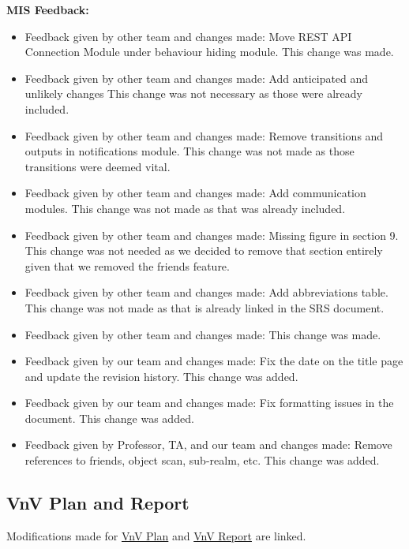 \documentclass{article}
\begin{document}
\textbf{MIS Feedback:}
\begin{itemize}
    \item Feedback given by other team and changes made: Move REST API Connection Module under behaviour hiding module. This change was made.
    \item Feedback given by other team and changes made: Add anticipated and unlikely changes This change was not necessary as those were already included.
    \item Feedback given by other team and changes made: Remove transitions and outputs in notifications module. This change was not made as those transitions were deemed vital.
    \item Feedback given by other team and changes made: Add communication modules. This change was not made as that was already included.
    \item Feedback given by other team and changes made: Missing figure in section 9. This change was not needed as we decided to remove that section entirely given that we removed the friends feature.
    \item Feedback given by other team and changes made: Add abbreviations table. This change was not made as that is already linked in the SRS document.
    \item Feedback given by other team and changes made:  This change was made.
    \item Feedback given by our team and changes made: Fix the date on the title page and update the revision history. This change was added.
    \item Feedback given by our team and changes made: Fix formatting issues in the document. This change was added.
    \item Feedback given by Professor, TA, and our team and changes made: Remove references to friends, object scan, sub-realm, etc. This change was added.
\end{itemize}

\subsection{VnV Plan and Report}

Modifications made for \href{https://github.com/russellrd/realm/pull/144}{VnV Plan} and \href{https://github.com/russellrd/realm/pull/151}{VnV Report} are linked.\\
\end{document}
